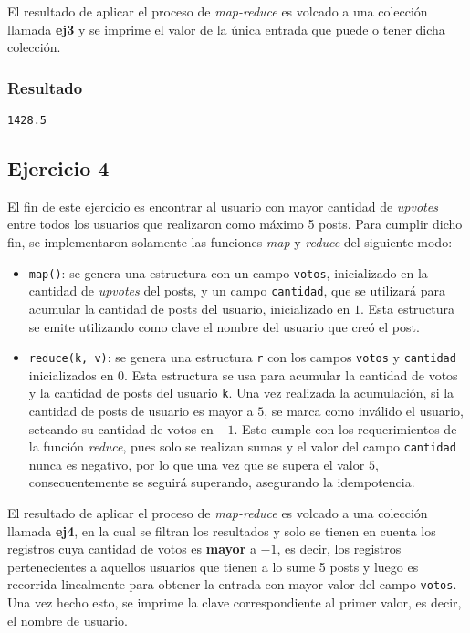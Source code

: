 \documentclass[a4paper]{article}
\begin{document}
El resultado de aplicar el proceso de \textit{map-reduce} es volcado a una
colección llamada \textbf{ej3} y se imprime el valor de la única entrada que
puede o tener dicha colección.

\subsubsection{Resultado}
\begin{verbatim}
1428.5
\end{verbatim}

\subsection{Ejercicio 4}
El fin de este ejercicio es encontrar al usuario con mayor cantidad de
\textit{upvotes} entre todos los usuarios que realizaron como máximo 5 posts.
Para cumplir dicho fin, se implementaron solamente las funciones \textit{map} y
\textit{reduce} del siguiente modo:
\begin{itemize}
  \item \verb|map()|: se genera una estructura con un campo \verb|votos|,
  inicializado en la cantidad de \textit{upvotes} del posts, y un campo
  \verb|cantidad|, que se utilizará para acumular la cantidad de posts del
  usuario, inicializado en $1$. Esta estructura se emite utilizando como clave
  el nombre del usuario que creó el post.
  \item \verb|reduce(k, v)|: se genera una estructura \verb|r| con los campos
  \verb|votos| y \verb|cantidad| inicializados en $0$. Esta estructura se usa
  para acumular la cantidad de votos y la cantidad de posts del usuario
  \verb|k|. Una vez realizada la acumulación, si la cantidad de posts de
  usuario es mayor a $5$, se marca como inválido el usuario, seteando su
  cantidad de votos en $-1$. Esto cumple con los requerimientos de la función
  \textit{reduce}, pues solo se realizan sumas y el valor del campo
  \verb|cantidad| nunca es negativo, por lo que una vez que se supera el valor
  $5$, consecuentemente se seguirá superando, asegurando la idempotencia.
\end{itemize}

El resultado de aplicar el proceso de \textit{map-reduce} es volcado a una
colección llamada \textbf{ej4}, en la cual se filtran los resultados y solo se
tienen en cuenta los registros cuya cantidad de votos es \textbf{mayor} a $-1$,
es decir, los registros pertenecientes a aquellos usuarios que tienen a lo sume
5 posts y luego es recorrida linealmente para obtener la entrada con mayor
valor del campo \verb|votos|. Una vez hecho esto, se imprime la clave
correspondiente al primer valor, es decir, el nombre de usuario.
\end{document}
